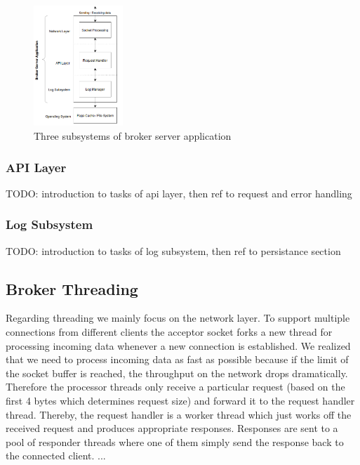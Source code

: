 \begin{figure}[H]
    \centering
    \includegraphics[width=0.3\textwidth]{images/design-subsystems.png}
    \caption{Three subsystems of broker server application}
    \label{fig:architecture-subsystems.png}
\end{figure}

\subsubsection{API Layer}

TODO: introduction to tasks of api layer, then ref to request and error handling

\subsubsection{Log Subsystem}

TODO: introduction to tasks of log subsystem, then ref to persistance section


\subsection{Broker Threading}
Regarding threading we mainly focus on the network layer. To support multiple
connections from different clients the acceptor socket forks a new thread for
processing incoming data whenever a new connection is established. We realized
that we need to process incoming data as fast as possible because if the limit
of the socket buffer is reached, the throughput on the network drops
dramatically. Therefore the processor threads only receive a
particular request (based on the first 4 bytes which determines request size)
and forward it to the request handler thread. Thereby, the request handler is a worker
thread which just works off the received request and produces appropriate
responses. Responses are sent to a pool of responder threads where one of them simply send the
response back to the connected client.
...

